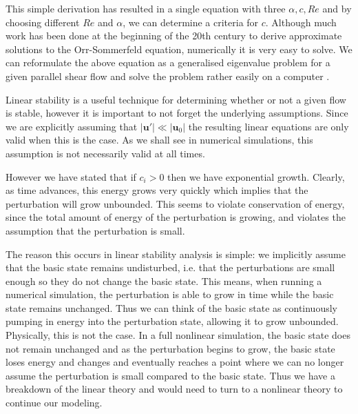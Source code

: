 This simple derivation has resulted in a single equation with three  $\alpha,c,Re$ and by choosing different $Re$ and $\alpha$, we can determine a criteria for $c$. Although much work has been done at the beginning of the 20th century to derive approximate solutions to the Orr-Sommerfeld equation, numerically it is very easy to solve. We can reformulate the above equation as a generalised eigenvalue problem for a given parallel shear flow and solve the problem rather easily on a computer \cite{trefethen_spectral}.

Linear stability is a useful technique for determining whether or not a given flow is stable, however it is important to not forget the underlying assumptions. Since we are explicitly assuming that $|\bm{u}'|\ll |\bm{u}_{0}|$ the resulting linear equations are only valid when this is the case. As we shall see in numerical simulations, this assumption is not necessarily valid at all times. 

 However we have stated that if $c_{i}>0$ then we have exponential growth. Clearly, as time advances, this energy grows very quickly which implies that the perturbation will grow unbounded. This seems to violate conservation of energy, since the total amount of energy of the perturbation is growing, and violates the assumption that the perturbation is small.  

The reason this occurs in linear stability analysis is simple: we implicitly assume that the basic state remains undisturbed, i.e. that the perturbations are small enough so they do not change the basic state. This means, when running a numerical simulation, the perturbation is able to grow in time while the basic state remains unchanged. Thus we can think of the basic state as continuously pumping in energy into the perturbation state, allowing it to grow unbounded. Physically, this is not the case. In a full nonlinear simulation, the basic state does not remain unchanged and as the perturbation begins to grow, the basic state loses energy and changes and eventually reaches a point where we can no longer assume the perturbation is small compared to the basic state. Thus we have a breakdown of the linear theory and would need to turn to a nonlinear theory to continue our modeling. 

